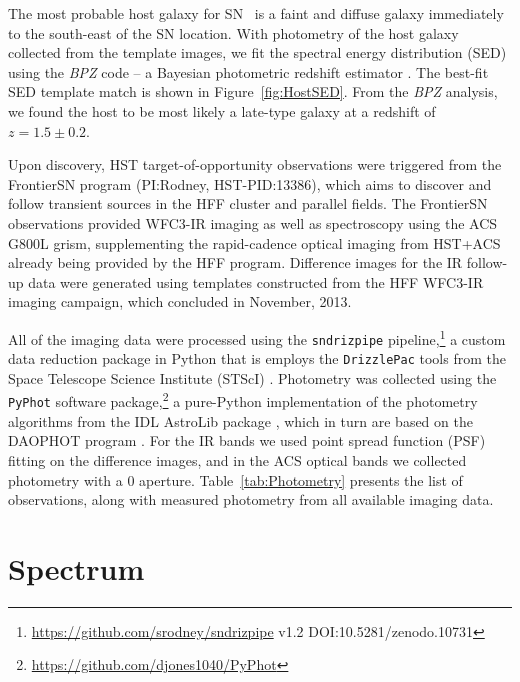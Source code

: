 The most probable host galaxy for SN \tomas\ is a faint and diffuse
galaxy immediately to the south-east of the SN location.  With
photometry of the host galaxy collected from the template images, we
fit the spectral energy distribution (SED) using the {\it BPZ} code --
a Bayesian photometric redshift estimator \citep{Benitez:2000}. The best-fit
SED template match is shown in Figure~\ref{fig:HostSED}.  From the
{\it BPZ} analysis, we found the host to be most likely a late-type
galaxy at a redshift of $z=1.5\pm0.2$.  




Upon discovery, HST target-of-opportunity
observations were triggered from the FrontierSN program (PI:Rodney,
HST-PID:13386), which aims to discover and follow transient sources in
the HFF cluster and parallel fields. The FrontierSN observations
provided WFC3-IR imaging as well as spectroscopy using the ACS G800L
grism, supplementing the rapid-cadence optical imaging from HST+ACS
already being provided by the HFF program. Difference images for the
IR follow-up data were generated using templates constructed from the
HFF WFC3-IR imaging campaign, which concluded in November, 2013.

All of the imaging data were processed using the {\tt sndrizpipe}
pipeline,\footnote{\url{https://github.com/srodney/sndrizpipe} v1.2
DOI:10.5281/zenodo.10731} a custom data reduction package in Python
that is employs the {\tt DrizzlePac} tools from the Space Telescope
Science Institute (STScI) \citep{Fruchter:2010}.  Photometry was
collected using the {\tt PyPhot} software
package,\footnote{\url{https://github.com/djones1040/PyPhot}} a
pure-Python implementation of the photometry algorithms from the IDL
AstroLib package \citep{Landsman:1993}, which in turn are based on the
DAOPHOT program \citep{Stetson:1987}.  For the IR bands we used point
spread function (PSF) fitting on the difference images, and in the ACS
optical bands we collected photometry with a
0 aperture. Table~\ref{tab:Photometry} presents the list of
observations, along with measured photometry from all available
imaging data.
 


\section{Spectrum}
\label{sec:Spectrum}

